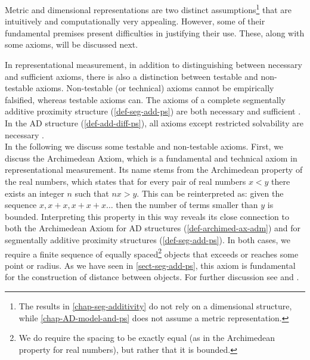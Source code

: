 Metric and dimensional representations are two distinct assumptions\footnote{The results in \cref{chap-seg-additivity} do not rely on a dimensional structure, while \cref{chap-AD-model-and-ps} does not assume a metric representation.} that are intuitively and computationally very appealing.
However, some of their fundamental premises present difficulties in justifying their use. These, along with some axioms, will be discussed next.


In representational measurement, in addition to distinguishing between necessary and sufficient axioms, there is also a distinction between testable and non-testable axioms.
Non-testable (or technical) axioms cannot be empirically falsified, whereas testable axioms can.
The axioms of a complete segmentally additive proximity structure (\cref{def-seg-add-ps}) are both necessary and sufficient \parencite[p. 168]{foundations2}. In the AD structure (\cref{def-add-diff-ps}), all axioms except restricted solvability are necessary \parencite[p. 184]{foundations2}.\\
In the following we discuss some testable and non-testable axioms.
First, we discuss the Archimedean Axiom, which is a fundamental and technical axiom in representational measurement. Its name stems from the Archimedean property of the real numbers, which states that for every pair of real numbers $x < y$ there exists an integer $n$ such that $n x > y$.
This can be reinterpreted as: given the sequence $x, x+x, x+x+x \dots$ then the number of terms smaller than $y$ is bounded.
Interpreting this property in this way reveals its close connection to both the Archimedean Axiom for AD structures (\cref{def-archimed-ax-adm}) and for segmentally additive proximity structures (\cref{def-seg-add-ps}).
In both cases, we require a finite sequence of equally spaced\footnote{We do require the spacing to be exactly equal (as in the Archimedean property for real numbers), but rather that it is bounded.} objects that exceeds or reaches some point or radius.
As we have seen in \cref{sect-seg-add-ps}, this axiom is fundamental for the construction of distance between objects.
For further discussion see \textcite[pp. 25-26]{foundations1} and \textcite[pp. 165-167]{foundations2}.


